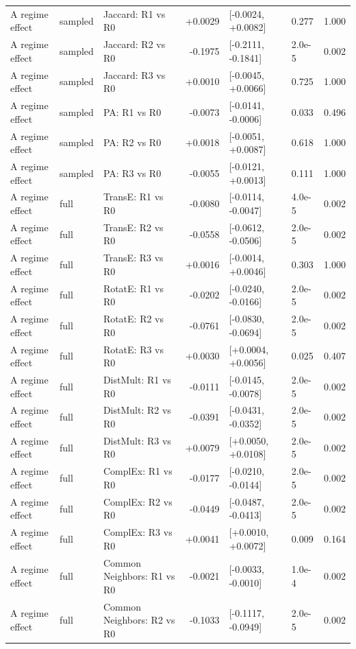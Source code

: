 \begin{tabular}{lllrlll}
A regime effect & sampled & Jaccard: R1 vs R0 & +0.0029 & [-0.0024, +0.0082] & 0.277 & 1.000 \\
A regime effect & sampled & Jaccard: R2 vs R0 & -0.1975 & [-0.2111, -0.1841] & 2.0e-5 & 0.002 \\
A regime effect & sampled & Jaccard: R3 vs R0 & +0.0010 & [-0.0045, +0.0066] & 0.725 & 1.000 \\
A regime effect & sampled & PA: R1 vs R0 & -0.0073 & [-0.0141, -0.0006] & 0.033 & 0.496 \\
A regime effect & sampled & PA: R2 vs R0 & +0.0018 & [-0.0051, +0.0087] & 0.618 & 1.000 \\
A regime effect & sampled & PA: R3 vs R0 & -0.0055 & [-0.0121, +0.0013] & 0.111 & 1.000 \\
A regime effect & full & TransE: R1 vs R0 & -0.0080 & [-0.0114, -0.0047] & 4.0e-5 & 0.002 \\
A regime effect & full & TransE: R2 vs R0 & -0.0558 & [-0.0612, -0.0506] & 2.0e-5 & 0.002 \\
A regime effect & full & TransE: R3 vs R0 & +0.0016 & [-0.0014, +0.0046] & 0.303 & 1.000 \\
A regime effect & full & RotatE: R1 vs R0 & -0.0202 & [-0.0240, -0.0166] & 2.0e-5 & 0.002 \\
A regime effect & full & RotatE: R2 vs R0 & -0.0761 & [-0.0830, -0.0694] & 2.0e-5 & 0.002 \\
A regime effect & full & RotatE: R3 vs R0 & +0.0030 & [+0.0004, +0.0056] & 0.025 & 0.407 \\
A regime effect & full & DistMult: R1 vs R0 & -0.0111 & [-0.0145, -0.0078] & 2.0e-5 & 0.002 \\
A regime effect & full & DistMult: R2 vs R0 & -0.0391 & [-0.0431, -0.0352] & 2.0e-5 & 0.002 \\
A regime effect & full & DistMult: R3 vs R0 & +0.0079 & [+0.0050, +0.0108] & 2.0e-5 & 0.002 \\
A regime effect & full & ComplEx: R1 vs R0 & -0.0177 & [-0.0210, -0.0144] & 2.0e-5 & 0.002 \\
A regime effect & full & ComplEx: R2 vs R0 & -0.0449 & [-0.0487, -0.0413] & 2.0e-5 & 0.002 \\
A regime effect & full & ComplEx: R3 vs R0 & +0.0041 & [+0.0010, +0.0072] & 0.009 & 0.164 \\
A regime effect & full & Common Neighbors: R1 vs R0 & -0.0021 & [-0.0033, -0.0010] & 1.0e-4 & 0.002 \\
A regime effect & full & Common Neighbors: R2 vs R0 & -0.1033 & [-0.1117, -0.0949] & 2.0e-5 & 0.002 \\

\end{tabular}
